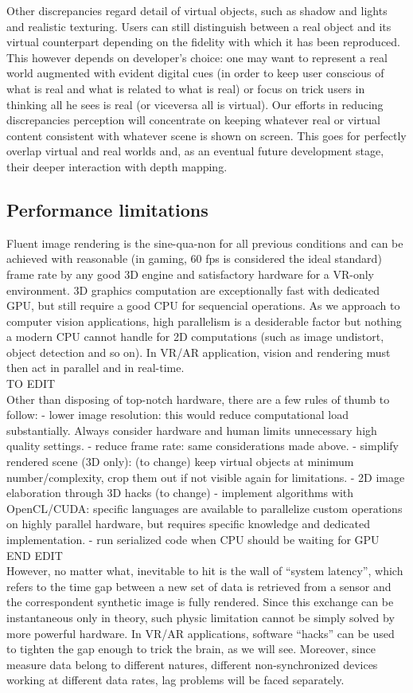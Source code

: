 Other discrepancies regard detail of virtual objects, such as shadow and lights and realistic texturing. Users can still distinguish between a real object and its virtual counterpart depending on the fidelity with which it has been reproduced. This however depends on developer’s choice: one may want to represent a real world augmented with evident digital cues (in order to keep user conscious of what is real and what is related to what is real) or focus on trick users in thinking all he sees is real (or viceversa all is virtual). Our efforts in reducing discrepancies perception will concentrate on keeping whatever real or virtual content consistent with whatever scene is shown on screen. This goes for perfectly overlap virtual and real worlds and, as an eventual future development stage, their deeper interaction with depth mapping.

\subsection{Performance limitations}
Fluent image rendering is the sine-qua-non for all previous conditions and can be achieved with reasonable (in gaming, 60 fps is considered the ideal standard) frame rate by any good 3D engine and satisfactory hardware for a VR-only environment. 3D graphics computation are exceptionally fast with dedicated GPU, but still require a good CPU for sequencial operations. As we approach to computer vision applications, high parallelism is a desiderable factor but nothing a modern CPU cannot handle for 2D computations (such as image undistort, object detection and so on). In VR/AR application, vision and rendering must then act in parallel and in real-time.\\
TO EDIT\\
Other than disposing of top-notch hardware, there are a few rules of thumb to follow:
- lower image resolution: this would reduce computational load substantially. Always consider hardware and human limits unnecessary high quality settings.
- reduce frame rate: same considerations made above.
- simplify rendered scene (3D only): (to change) keep virtual objects at minimum number/complexity, crop them out if not visible again for limitations.
- 2D image elaboration through 3D hacks (to change)
- implement algorithms with OpenCL/CUDA: specific languages are available to parallelize custom operations on highly parallel hardware, but requires specific knowledge and dedicated implementation.
- run serialized code when CPU should be waiting for GPU\\
END EDIT\\
However, no matter what, inevitable to hit is the wall of “system latency”, which refers to the time gap between a new set of data is retrieved from a sensor and the correspondent synthetic image is fully rendered. Since this exchange can be instantaneous only in theory, such physic limitation cannot be simply solved by more powerful hardware. In VR/AR applications, software “hacks” can be used to tighten the gap enough to trick the brain, as we will see. Moreover, since measure data belong to different natures, different non-synchronized devices working at different data rates, lag problems will be faced separately. 


